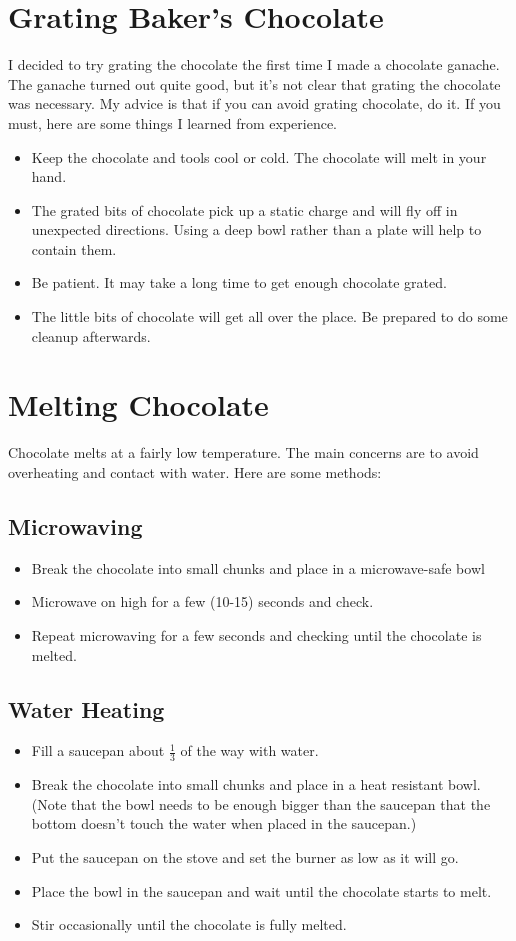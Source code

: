 \documentclass[10pt, openany]{book}
\begin{document}
\section{Grating Baker's Chocolate}
\label{tip:GrateChocolate}
I decided to try grating the chocolate the first time I made a chocolate ganache.  The ganache turned out quite good, but it's not clear that grating the chocolate was necessary.  My advice is that if you can avoid grating chocolate, do it.  If you must, here are some things I learned from experience.
\begin{itemize}
  \item Keep the chocolate and tools cool or cold.  The chocolate will melt in your hand.
  \item The grated bits of chocolate pick up a static charge and will fly off in unexpected directions.  Using a deep bowl rather than a plate will help to contain them.
  \item Be patient.  It may take a long time to get enough chocolate grated.
  \item The little bits of chocolate will get all over the place.  Be prepared to do some cleanup afterwards.
\end{itemize}

\section{Melting Chocolate}
\label{tip:MeltChocolate}
Chocolate melts at a fairly low temperature.  The main concerns are to avoid overheating and contact with water.  Here are some methods:
\subsection{Microwaving}
\begin{itemize}
  \item Break the chocolate into small chunks and place in a microwave-safe bowl
  \item Microwave on high for a few (10-15) seconds and check.
  \item Repeat microwaving for a few seconds and checking until the chocolate is melted.
\end{itemize}
\subsection{Water Heating}
\begin{itemize}
  \item Fill a saucepan about $\frac{1}{3}$ of the way with water.
  \item Break the chocolate into small chunks and place in a heat resistant bowl.  (Note that the bowl needs to be enough bigger than the saucepan that the bottom doesn't touch the water when placed in the saucepan.)
  \item Put the saucepan on the stove and set the burner as low as it will go.
  \item Place the bowl in the saucepan and wait until the chocolate starts to melt.
  \item Stir occasionally until the chocolate is fully melted.
\end{itemize}
\end{document}

